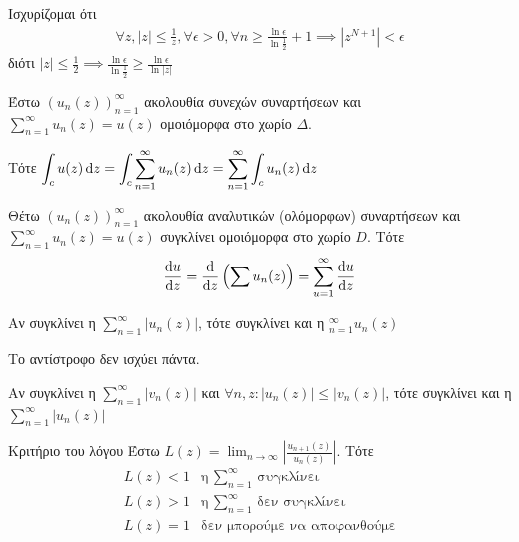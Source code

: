 \documentclass[12pt,a4paper,notitlepage,fleqn]{article}
\begin{document}
     Ισχυρίζομαι ότι
     \begin{align*}
     \forall z,|z|\leq\frac{1}{z}, \forall \epsilon>0, \forall n \geq
     \frac{\ln \epsilon}{\ln\frac{1}{2}}+1\implies\left|z^{N+1}\right|<\epsilon
     \end{align*}
     διότι \( \displaystyle
     |z| \leq \frac{1}{2}\implies
     \frac{\ln\epsilon}{\ln\frac{1}{2}} \geq \frac{\ln\epsilon}{\ln|z|} \)

     \begin{theorem*}[width=.7\textwidth]{}
     	Έστω \( \left(u_n(z)\right)_{n=1}^\infty \) ακολουθία συνεχών συναρτήσεων
     	και \( \sum_{n=1}^\infty u_n(z)=u(z) \) ομοιόμορφα στο χωρίο \( \Delta \).

     	Τότε \(\displaystyle
     	\int_c u(z)\mathop{}\!\mathrm{d} z = \int_c \sum_{n=1}^\infty u_n(z)\mathop{}\!\mathrm{d} z
     	= \sum_{n=1}^\infty \int_c u_n(z)\mathop{}\!\mathrm{d} z
     	\)
     \end{theorem*}
     \begin{theorem*}[width=.7\textwidth]{}
     	Θέτω \( \left( u_n(z) \right)_{n=1}^\infty \) ακολουθία αναλυτικών (ολόμορφων)
     	συναρτήσεων και \( \sum_{n=1}^\infty u_n(z) = u(z)\) συγκλίνει ομοιόμορφα
     	στο χωρίο \( D \). Τότε \[
     	\od{u}{z} = \od{}{z}\left(\sum u_n(z) \right) = \sum_{u=1}^\infty
     	\od{u}{z}
     	\]
     \end{theorem*}

     \begin{theorem*}{}
     	Αν συγκλίνει η \( \displaystyle \sum_{n=1}^\infty \left|u_n(z)\right| \),
     	τότε συγκλίνει και η \( \displaystyle_{n=1}^\infty u_n(z)\)

     	Το αντίστροφο δεν ισχύει πάντα.
     \end{theorem*}

     \begin{theorem*}{}
     	Αν συγκλίνει η \( \displaystyle \sum_{n=1}^\infty \left|v_n(z)\right| \)
     	και \( \forall n,z:\left|u_n(z)\right| \leq \left|v_n(z)\right|\),
        τότε συγκλίνει και η \( \displaystyle \sum_{n=1}^\infty \left|
        u_n(z)
        \right| \)
     \end{theorem*}

     \begin{theorem*}{Κριτήριο του λόγου}
     	Έστω \( \displaystyle L(z) = \lim_{n\to \infty} \left|
     	\frac{u_{n+1}(z)}{u_n(z)}
     	\right| \). Τότε
     	\[
     	\begin{array}{ll}
     	L(z) < 1 & \text{η $\displaystyle\sum_{n=1}^\infty$ συγκλίνει} \\
     	L(z) > 1 & \text{η $\displaystyle\sum_{n=1}^\infty$ δεν συγκλίνει} \\
     	L(z) = 1 & \text{δεν μπορούμε να αποφανθούμε} \\
     	\end{array}
     	\]
     \end{theorem*}
\end{document}
